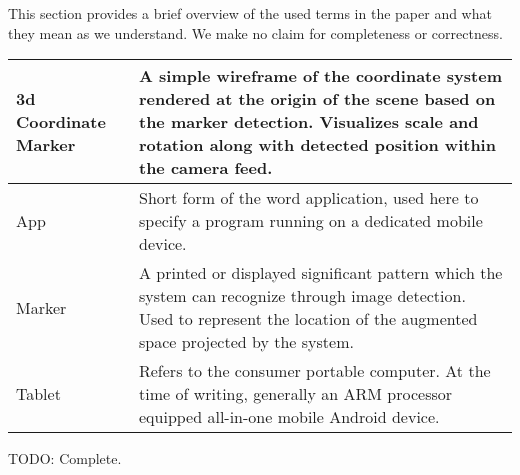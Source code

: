 This section provides a brief overview of the used terms in the paper and what they mean as we understand.
We make no claim for completeness or correctness.

\begin{tabulary}{\textwidth}{L|L}
3d Coordinate Marker & A simple wireframe of the coordinate system rendered at the origin of the scene based on the marker detection. Visualizes scale and rotation along with detected position within the camera feed. \\
\hline
App & Short form of the word application, used here to specify a program running on a dedicated mobile device. \\
\hline
Marker & A printed or displayed significant pattern which the system can recognize through image detection. Used to represent the location of the augmented space projected by the system. \\
\hline
Tablet & Refers to the consumer portable computer. At the time of writing, generally an ARM processor equipped all-in-one mobile Android device.\\
\end{tabulary}

TODO: Complete.